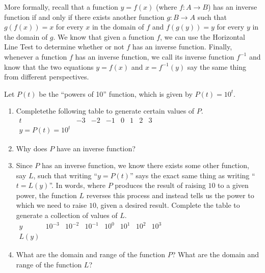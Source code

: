 \documentclass[nooutcomes]{ximera}
\begin{document}
More formally, recall that a function \(y = f(x)\) (where \(f : A \to B\)) has an inverse function if and only if there exists another function \(g : B \to A\) such that \(g(f(x)) = x\) for every \(x\) in the domain of \(f\) and \(f(g(y)) = y\) for every $y$ in the domain of $g$.    We know that given a function \(f\), we can use the Horizontal Line Test to determine whether or not \(f\) has an inverse function.  Finally, whenever a function \(f\) has an inverse function, we call its inverse function \(f^{-1}\) and know that the two equations \(y = f(x)\) and \(x = f^{-1}(y)\) say the same thing from different perspectives.%
\begin{exploration}

Let \(P(t)\) be the ``powers of 10'' function, which is given by \(P(t) = 10^t\).%

\begin{enumerate}[label=\alph*.]
\item
Completethe following table to generate certain values of \(P\).%
\\
$
\begin{array}{llllllll}
t&-3&-2&-1&0&1&2&3\\
\hline
y = P(t) = 10^t&~&~&~&~&~&~&
\end{array}
$
\item
Why does \(P\) have an inverse function?%
\item
Since \(P\) has an inverse function, we know there exists some other function, say \(L\), such that writing ``\(y = P(t)\)'' says the exact same thing as writing ``\(t = L(y)\)''.  In words, where \(P\) produces the result of raising \(10\) to a given power, the function \(L\) reverses this process and instead tells us the power to which we need to raise \(10\), given a desired result.  Complete the table to generate a collection of values of \(L\).%
\\
$
\begin{array}{llllllll}
y&10^{-3}&10^{-2}&10^{-1}&10^{0}&10^{1}&10^{2}&10^{3}\\
\hline
L(y)&~&~&~&~&~&~&
\end{array}
$
\item
What are the domain and range of the function \(P\)?  What are the domain and range of the function \(L\)?%
\end{enumerate}
%
\end{exploration}


%
%
%
\end{document}
